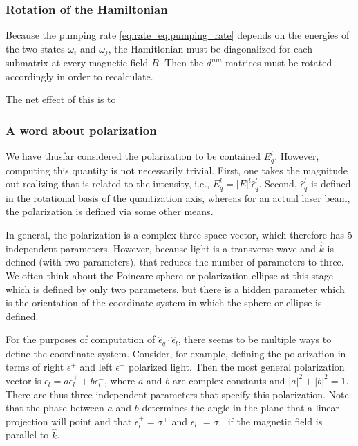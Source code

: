 \documentclass[final,5p,times,twocolumn]{elsarticle}
\begin{document}
\subsubsection{Rotation of the Hamiltonian}
Because the pumping rate \eqref{eq:rate_eq:pumping_rate} depends on the energies of the two states $\omega_i$ and $\omega_j$, the Hamitlonian must be diagonalized for each submatrix at every magnetic field $B$.  Then the $d^{nm}$ matrices must be rotated accordingly in order to recalculate.

The net effect of this is to 


\subsubsection{A word about polarization}
We have thusfar considered the polarization to be contained $E^l_q$.  However,
computing this quantity is not necessarily trivial.  First, one takes the
magnitude out realizing that is related to the intensity, i.e., $E^l_q =
|E|^l\hat{\epsilon}^l_q$.  Second, $\hat{\epsilon}^l_q$ is defined in the
rotational basis of the quantization axis, whereas for an actual laser beam,
the polarization is defined via some other means.

In general, the polarization is a complex-three space vector, which therefore
has 5 independent parameters.  However, because light is a transverse wave and
$\hat{k}$ is defined (with two parameters), that reduces the number of
parameters to three.  We often think about the Poincare sphere or polarization
ellipse at this stage which is defined by only two parameters, but there is a
hidden parameter which is the orientation of the coordinate system in which
the sphere or ellipse is defined.

For the purposes of computation of $\hat{\epsilon}_q\cdot\hat{\epsilon}_l$,
there seems to be multiple ways to define the coordinate system.  Consider, for
example, defining the polarization in terms of right $\epsilon^+$ and left
$\epsilon^-$ polarized light.  Then the most general polarization vector is
$\epsilon_l = a \epsilon^+_l + b \epsilon^-_l$, where $a$ and $b$ are complex
constants and $|a|^2+|b|^2=1$.  There are thus three independent parameters that
specify this polarization.  Note that the phase between $a$ and $b$ determines
the angle in the plane that a linear projection will point and that
$\epsilon^+_l=\sigma^+$ and $\epsilon^-_l=\sigma^-$ if the magnetic field is
parallel to $\hat{k}$.
\end{document}
